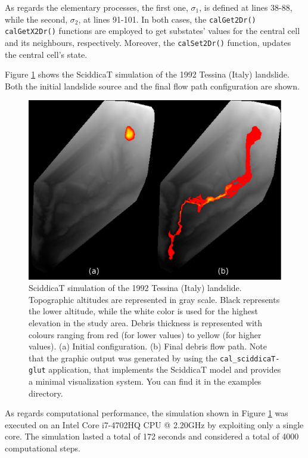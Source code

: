As regards the elementary processes, the first one, $\sigma_1$, is
defined at lines 38-88, while the second, $\sigma_2$, at lines
91-101. In both cases, the \verb'calGet2Dr()' \verb'calGetX2Dr()'
functions are employed to get substates' values for the central cell and
its neighbours, respectively. Moreover, the \verb'calSet2Dr()'
function, updates the central cell's state.

Figure \ref{fig:sciddicaT} shows the SciddicaT simulation of the 1992
Tessina (Italy) landslide. Both the initial landslide source and the
final flow path configuration are shown.

\begin{figure}[htbp]
  \centering
  \includegraphics[width=12cm]{./images/OpenCAL/sciddicaT}
  \caption{SciddicaT simulation of the 1992 Tessina (Italy)
    landslide. Topographic altitudes are represented in gray
    scale. Black represents the lower altitude, while the white color
    is used for the highest elevation in the study area. Debris
    thickness is represented with colours ranging from red (for lower
    values) to yellow (for higher values). (a) Initial
    configuration. (b) Final debris flow path. Note that the graphic
    output was generated by using the \texttt{cal\_sciddicaT-glut}
    application, that implements the SciddicaT model and provides a
    minimal visualization system. You can find it in the examples
    directory.}
  \label{fig:sciddicaT}
\end{figure}

As regards computational performance, the simulation shown in Figure
\ref{fig:sciddicaT} was executed on an Intel Core i7-4702HQ CPU @
2.20GHz by exploiting only a single core. The simulation lasted a
total of 172 seconds and considered a total of 4000 computational steps.

